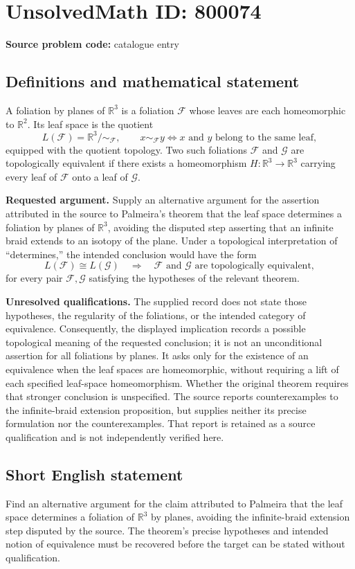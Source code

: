 \documentclass[11pt]{article}
\newcommand{\R}{\mathbb{R}}
\begin{document}
\section*{UnsolvedMath ID: 800074}
\textbf{Source problem code:} catalogue entry
\subsection{Definitions and mathematical statement}
A foliation by planes of \(\R^3\) is a foliation \(\mathcal F\) whose leaves are each homeomorphic to \(\R^2\). Its leaf space is the quotient
\[
L(\mathcal F)=\R^3/{\sim_{\mathcal F}},\qquad x\sim_{\mathcal F}y\iff x\text{ and }y\text{ belong to the same leaf},
\]
equipped with the quotient topology. Two such foliations \(\mathcal F\) and \(\mathcal G\) are topologically equivalent if there exists a homeomorphism \(H:\R^3\to\R^3\) carrying every leaf of \(\mathcal F\) onto a leaf of \(\mathcal G\).

\textbf{Requested argument.} Supply an alternative argument for the assertion attributed in the source to Palmeira's theorem that the leaf space determines a foliation by planes of \(\R^3\), avoiding the disputed step asserting that an infinite braid extends to an isotopy of the plane. Under a topological interpretation of ``determines,'' the intended conclusion would have the form
\[
L(\mathcal F)\cong L(\mathcal G)
\quad\Longrightarrow\quad
\mathcal F\text{ and }\mathcal G\text{ are topologically equivalent},
\]
for every pair \(\mathcal F,\mathcal G\) satisfying the hypotheses of the relevant theorem.

\textbf{Unresolved qualifications.} The supplied record does not state those hypotheses, the regularity of the foliations, or the intended category of equivalence. Consequently, the displayed implication records a possible topological meaning of the requested conclusion; it is not an unconditional assertion for all foliations by planes. It asks only for the existence of an equivalence when the leaf spaces are homeomorphic, without requiring a lift of each specified leaf-space homeomorphism. Whether the original theorem requires that stronger conclusion is unspecified. The source reports counterexamples to the infinite-braid extension proposition, but supplies neither its precise formulation nor the counterexamples. That report is retained as a source qualification and is not independently verified here.
\subsection{Short English statement}
Find an alternative argument for the claim attributed to Palmeira that the leaf space determines a foliation of \(\R^3\) by planes, avoiding the infinite-braid extension step disputed by the source. The theorem's precise hypotheses and intended notion of equivalence must be recovered before the target can be stated without qualification.
\end{document}
